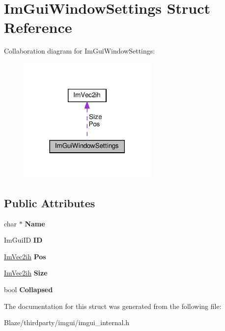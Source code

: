 \hypertarget{structImGuiWindowSettings}{}\section{Im\+Gui\+Window\+Settings Struct Reference}
\label{structImGuiWindowSettings}


Collaboration diagram for Im\+Gui\+Window\+Settings\+:\nopagebreak
\begin{figure}[H]
\begin{center}
\leavevmode
\includegraphics[width=194pt]{structImGuiWindowSettings__coll__graph}
\end{center}
\end{figure}
\subsection*{Public Attributes}
\begin{DoxyCompactItemize}
\item 
\mbox{\label{structImGuiWindowSettings_a840259e14a45a600f84fcb940554e2d5}} 
char $\ast$ {\bfseries Name}
\item 
\mbox{\label{structImGuiWindowSettings_a5ae7316219230c82a05618c227e5a7b7}} 
Im\+Gui\+ID {\bfseries ID}
\item 
\mbox{\label{structImGuiWindowSettings_afe2e8f97751166b10042bfd537e77c89}} 
\hyperlink{structImVec2ih}{Im\+Vec2ih} {\bfseries Pos}
\item 
\mbox{\label{structImGuiWindowSettings_a7e4a26f4e4bfaf97a379641dcdbb6d14}} 
\hyperlink{structImVec2ih}{Im\+Vec2ih} {\bfseries Size}
\item 
\mbox{\label{structImGuiWindowSettings_a79308182bdab97cb87b3d6284f22c1d2}} 
bool {\bfseries Collapsed}
\end{DoxyCompactItemize}


The documentation for this struct was generated from the following file\+:\begin{DoxyCompactItemize}
\item 
Blaze/thirdparty/imgui/imgui\+\_\+internal.\+h\end{DoxyCompactItemize}
